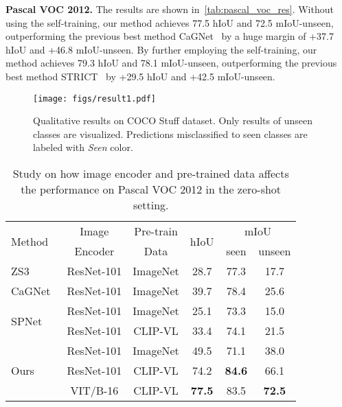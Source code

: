 \documentclass[runningheads]{llncs}
\begin{document}
\noindent\textbf{Pascal VOC 2012.}
The results are shown in~\cref{tab:pascal_voc_res}. Without using the self-training, our method achieves 77.5 hIoU and 72.5 mIoU-unseen, outperforming the previous best method CaGNet~\cite{gu2020context} by a huge margin of +37.7 hIoU and +46.8 mIoU-unseen. By further employing the self-training, our method achieves 79.3 hIoU and 78.1 mIoU-unseen, outperforming the previous best method STRICT~\cite{pastore2021closer} by +29.5 hIoU and +42.5 mIoU-unseen.

\begin{figure}[t]
  \centering
   \texttt{[image: figs/result1.pdf]}
   \caption{Qualitative results on COCO Stuff dataset. Only results of unseen classes are visualized. Predictions misclassified to seen classes are labeled with \textcolor[RGB]{161,40,100}{\emph{Seen}} color.}
   \label{fig:vis}
\end{figure} 
\begin{table}[]
    \footnotesize
    \centering
    \caption{Study on how image encoder and pre-trained data affects the performance on Pascal VOC 2012 in the zero-shot setting.}
    \begin{tabular}{l|c|c|c|c|c}
    \toprule
    \multirow{2}{*}{Method} & Image & Pre-train & \multirow{2}{*}{hIoU} & \multicolumn{2}{c}{mIoU}\\
    \cline{5-6}
    & Encoder & Data & & seen & unseen \\
     \hline
     ZS3~\cite{bucher2019zero} & ResNet-101 & ImageNet & 28.7 & 77.3 & 17.7 \\
     CaGNet~\cite{gu2020context} & ResNet-101 & ImageNet & 39.7 & 78.4 & 25.6\\
     \hline
     \multirow{2}{*}{SPNet~\cite{xian2019semantic}} & ResNet-101 & ImageNet & 25.1 & 73.3 & 15.0\\
     & ResNet-101 & CLIP-VL & 33.4 & 74.1 & 21.5 \\
     \hline
     \multirow{3}{*}{Ours} & ResNet-101 &ImageNet & 49.5 & 71.1 & 38.0\\
     & ResNet-101 & CLIP-VL& 74.2 & \textbf{84.6} & 66.1 \\
     & VIT/B-16 & CLIP-VL& \textbf{77.5} & 83.5 & \textbf{72.5} \\
     \hline
    \end{tabular}
    \label{tab:fair_pascal}
\end{table}
\end{document}
